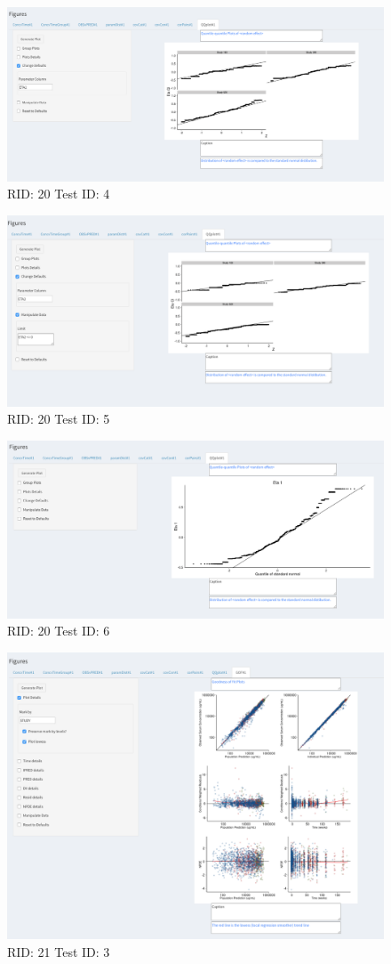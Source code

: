 \begin{figure}[H]
\includegraphics[width=.8\textwidth]{screencaps/20-4-1.png}
\caption{RID: 20 Test ID: 4}
\end{figure}
\begin{figure}[H]
\includegraphics[width=.8\textwidth]{screencaps/20-5-1.png}
\caption{RID: 20 Test ID: 5}
\end{figure}
\begin{figure}[H]
\includegraphics[width=.8\textwidth]{screencaps/20-6-1.png}
\caption{RID: 20 Test ID: 6}
\end{figure}
\begin{figure}[H]
\includegraphics[width=.8\textwidth]{screencaps/21-3-1.png}
\caption{RID: 21 Test ID: 3}
\end{figure}
